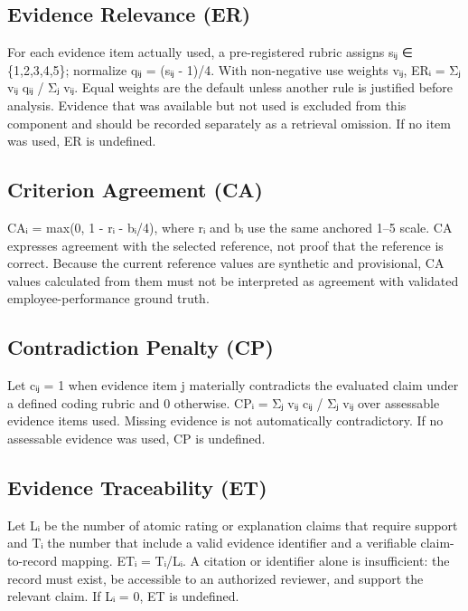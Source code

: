 \documentclass[
  10pt,
  runningheads]{llncs}
\begin{document}
\subsection{Evidence Relevance (ER)}\label{evidence-relevance-er}

For each evidence item actually used, a pre-registered rubric assigns
sᵢⱼ ∈ \{1,2,3,4,5\}; normalize qᵢⱼ = (sᵢⱼ - 1)/4. With non-negative use
weights vᵢⱼ, ERᵢ = Σⱼ vᵢⱼ qᵢⱼ / Σⱼ vᵢⱼ. Equal weights are the default
unless another rule is justified before analysis. Evidence that was
available but not used is excluded from this component and should be
recorded separately as a retrieval omission. If no item was used, ER is
undefined.

\subsection{Criterion Agreement (CA)}\label{criterion-agreement-ca}

CAᵢ = max(0, 1 - \textbar rᵢ - bᵢ\textbar/4), where rᵢ and bᵢ use the
same anchored 1--5 scale. CA expresses agreement with the selected
reference, not proof that the reference is correct. Because the current
reference values are synthetic and provisional, CA values calculated
from them must not be interpreted as agreement with validated
employee-performance ground truth.

\subsection{Contradiction Penalty
(CP)}\label{contradiction-penalty-cp}

Let cᵢⱼ = 1 when evidence item j materially contradicts the evaluated
claim under a defined coding rubric and 0 otherwise. CPᵢ = Σⱼ vᵢⱼ cᵢⱼ /
Σⱼ vᵢⱼ over assessable evidence items used. Missing evidence is not
automatically contradictory. If no assessable evidence was used, CP is
undefined.

\subsection{Evidence Traceability
(ET)}\label{evidence-traceability-et}

Let Lᵢ be the number of atomic rating or explanation claims that require
support and Tᵢ the number that include a valid evidence identifier and a
verifiable claim-to-record mapping. ETᵢ = Tᵢ/Lᵢ. A citation or
identifier alone is insufficient: the record must exist, be accessible
to an authorized reviewer, and support the relevant claim. If Lᵢ = 0, ET
is undefined.
\end{document}
